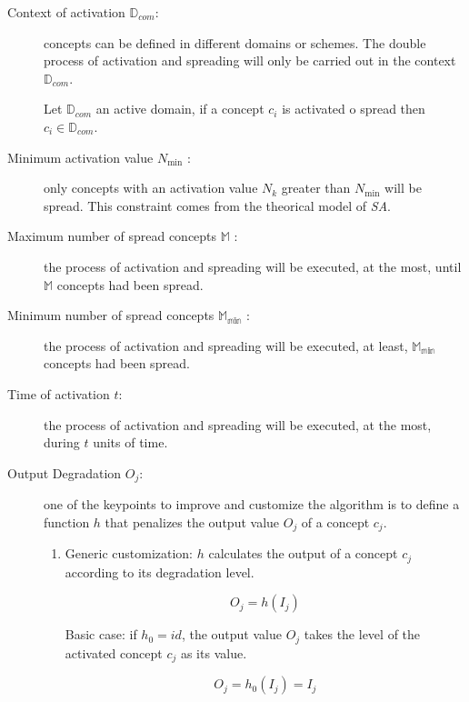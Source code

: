 \documentclass{llncs}
\begin{document}
\begin{description}

\item[Context of activation $\mathbb{D}_{com}$:] concepts can be defined in different
domains or schemes. The double process of activation and spreading  will only be carried out in the
context $\mathbb{D}_{com}$.


\begin{definition}
Let $\mathbb{D}_{com}$ an active domain, if a concept $c_i$ is activated o
spread then $c_{i} \in \mathbb{D}_{com}$.
\end{definition}

\item[Minimum activation value $N_{\min}$ :] only concepts with an activation
value $N_k$ greater than $N_{\min}$ will be spread. This constraint comes from
the theorical model of \textit{SA}.

\item[Maximum number of spread concepts $\mathbb{M}$ :] the process of
activation and spreading will be executed, at the most, until $\mathbb{M}$ concepts
had been spread.

\item[Minimum number of spread concepts $\mathbb{M_{\min}}$ :] the process of
activation and spreading will be executed, at least, $\mathbb{M_{\min}}$ concepts had
been spread.

\item[Time of activation $t$:] the process of activation and spreading
will be executed, at the most, during $t$ units of time.

\item[Output Degradation $O_j$:] one of the keypoints to improve and customize
the algorithm is to define a function $h$ that penalizes the output value $O_j$
of a concept $c_j$.

\begin{enumerate}

\item Generic customization: $h$ calculates the output of a concept $c_j$
according to its degradation level.

\begin{equation}
O_j = h(I_j)
\end{equation}

Basic case: if $h_0 = id$, the output value $O_j$ takes the level of the
activated concept $c_j$ as its value.

\begin{equation}
O_j = h_0(I_j) = I_j
\end{equation}



\end{enumerate}
\end{description}
\end{document}
